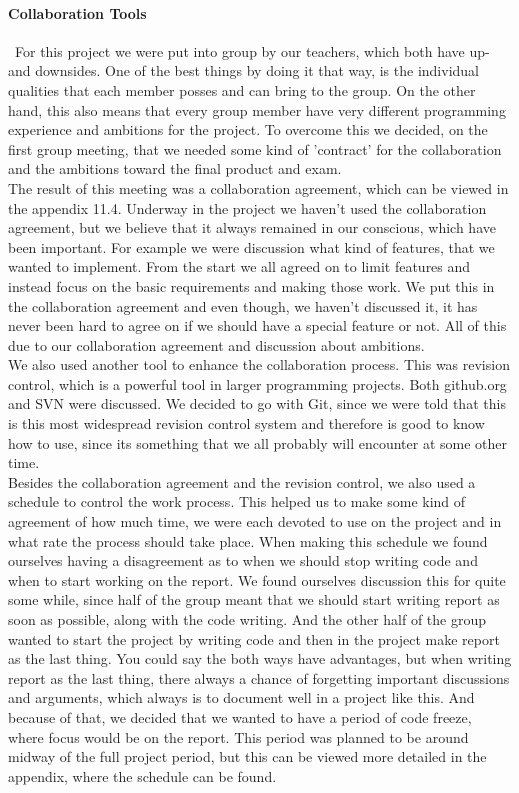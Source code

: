\documentclass[a4paper,10pt,titlepage]{article}
\begin{document}
	\paragraph{Collaboration Tools}\mbox{}\
	For this project we were put into group by our teachers, which both have up- and downsides. One of the best things by doing it that way, is the individual qualities that each member posses and can bring to the group. On the other hand, this also means that every group member have very different programming experience and ambitions for the project. To overcome this we decided, on the first group meeting, that we needed some kind of 'contract' for the collaboration and the ambitions toward the final product and exam.\\ The result of this meeting was a collaboration agreement, which can be viewed in the appendix 11.4. Underway in the project we haven't used the collaboration agreement, but we believe that it always remained in our conscious, which have been important. For example we were discussion what kind of features, that we wanted to implement. From the start we all agreed on to limit features and instead focus on the basic requirements and making those work. We put this in the collaboration agreement and even though, we haven't discussed it, it has never been hard to agree on if we should have a special feature or not. All of this due to our collaboration agreement and discussion about ambitions.\\
		We also used another tool to enhance the collaboration process. This was revision control, which is a powerful tool in larger programming projects. Both github.org and SVN were discussed. We decided to go with Git, since we were told that this is this most widespread revision control system and therefore is good to know how to use, since its something that we all probably will encounter at some other time.\\
		Besides the collaboration agreement and the revision control, we also used a schedule to control the work process. This helped us to make some kind of agreement of how much time, we were each devoted to use on the project and in what rate the process should take place. When making this schedule we found ourselves having a disagreement as to when we should stop writing code and when to start working on the report. We found ourselves discussion this for quite some while, since half of the group meant that we should start writing report as soon as possible, along with the code writing. And the other half of the group wanted to start the project by writing code and then in the project make report as the last thing. You could say the both ways have advantages, but when writing report as the last thing, there always a chance of forgetting important discussions and arguments, which always is to document well in a project like this. And because of that, we decided that we wanted to have a period of code freeze, where focus would be on the report. This period was planned to be around midway of the full project period, but this can be viewed more detailed in the appendix, where the schedule can be found.\\
		
\end{document}
